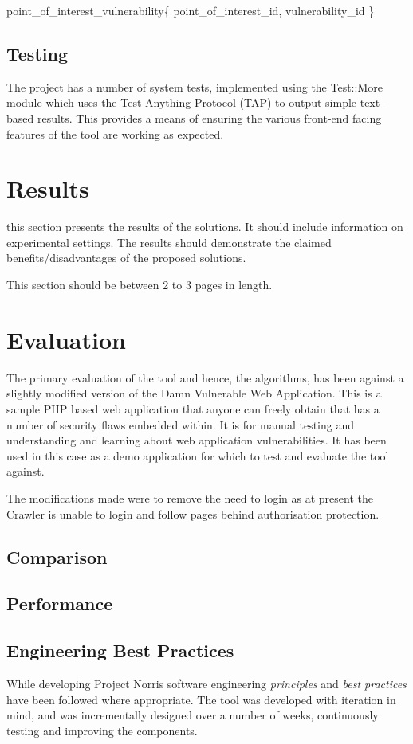 \documentclass[12pt,a4paper]{article}
\begin{document}
point\_of\_interest\_vulnerability\{ point\_of\_interest\_id, vulnerability\_id \}

\subsection{Testing}
The project has a number of system tests, implemented using the Test::More module which uses the Test Anything Protocol (TAP) to output simple text-based results.  This provides a means of ensuring the various front-end facing features of the tool are working as expected.

\section{Results}

this section presents the results of the solutions.  It should include information on experimental settings.  The results should demonstrate the claimed benefits/disadvantages of the proposed solutions.

This section should be between 2 to 3 pages in length.

\section{Evaluation}
The primary evaluation of the tool and hence, the algorithms, has been against a slightly modified version of the Damn Vulnerable Web Application.  This is a sample PHP based web application that anyone can freely obtain that has a number of security flaws embedded within.  It is for manual testing and understanding and learning about web application vulnerabilities.  It has been used in this case as a demo application for which to test and evaluate the tool against.

The modifications made were to remove the need to login as at present the Crawler is unable to login and follow pages behind authorisation protection.

\subsection{Comparison}

\subsection{Performance}

\subsection{Engineering Best Practices}
While developing Project Norris software engineering \emph{principles} and \emph{best practices} have been followed where appropriate.  The tool was developed with iteration in mind, and was incrementally designed over a number of weeks, continuously testing and improving the components.
\end{document}
